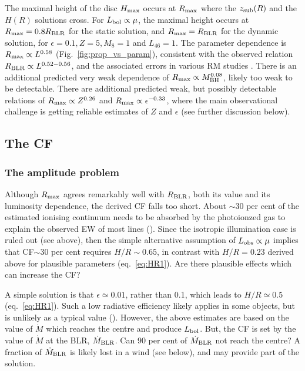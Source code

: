 \documentclass[a4paper,fleqn,usenatbib]{mnras}
\newcommand{\mdot}{\dot{M}}
\begin{document}
The maximal height of the disc $H_{\rm max}$ occurs at $R_{\rm max}$ where the $z_{\rm sub}(R)$ and 
the $H(R)$ solutions cross.
For $L_{\rm bol}\propto \mu$, the maximal height occurs at $R_{\rm max}=0.8R_{\rm BLR}$ for the static 
solution, and  $R_{\rm max}=R_{\rm BLR}$ for the dynamic
solution, for $\epsilon=0.1, Z = 5, M_8=1$ and $L_{46}=1$. The parameter dependence is
$R_{\rm max}\propto L^{0.58}$ (Fig.~\ref{fig:prop_vs_param}), consistent with the observed relation 
$R_{\rm BLR}\propto L^{0.52-0.56}$, and the associated errors in various RM studies 
\citep{Kaspi05, Bentz09, Bentz13}. There is an additional predicted
very weak dependence of $R_{\rm max} \propto M_{\rm BH}^{0.08}$, likely too weak to be detectable.
There are additional predicted weak, but possibly detectable relations of $R_{\rm max} \propto Z^{0.26}$ and
$R_{\rm max} \propto \epsilon^{-0.33}$, where the main observational challenge is getting reliable estimates of
$Z$ and $\epsilon$ (see further discussion below).



\subsection{The CF}
\subsubsection{The amplitude problem}\label{sec:CFamp}

Although $R_{\rm max}$ agrees remarkably well with $R_{\rm BLR}$, both its value and its
luminosity dependence, the derived CF falls too short. About $\sim 30$ per cent of the estimated
ionising continuum needs to be absorbed by the photoionzed gas to explain the observed EW
of most lines (\citealt{Korista97, Maiolino01, Ruff12, paperII}). Since the isotropic illumination 
case is ruled out (see above), then the simple alternative assumption of $L_{\rm obs}\propto \mu$
implies that CF$\sim 30$ per cent requires $H/R\sim 0.65$, in contrast with $H/R=0.23$ 
derived above for plausible parameters (eq.~\ref{eq:HR1}). Are there plausible effects which can
increase the CF? 

A simple solution is that $\epsilon\simeq 0.01$, rather than 0.1, which leads to 
$H/R\simeq 0.5$ (eq.~\ref{eq:HR1}). Such a low radiative efficiency likely applies in some
objects, but is unlikely as a typical value (\citealt{Soltan82, Yu02, Marconi04, DavisLaor11}).
However, the above estimates are based on the value of $\mdot$ which reaches the centre and
produce $L_{\rm bol}$. But, the CF is set by the value of $\mdot$ at the BLR, $\mdot_{\rm BLR}$.  
Can 90 per cent of $\mdot_{\rm BLR}$ not reach the centre?
A fraction of $\mdot_{\rm BLR}$ is likely lost in a wind (see below), and may provide part of the solution.
\end{document}
